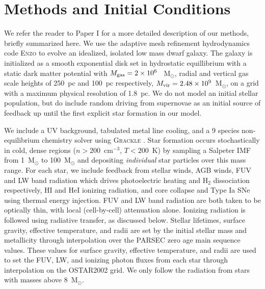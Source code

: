 \documentclass[twocolumn]{aastex62}
\begin{document}
{\section{Methods and Initial Conditions} \label{sec:methods}
We refer the reader to Paper I for a more detailed description of our methods, briefly summarized here. We use the adaptive mesh refinement hydrodynamics code \textsc{Enzo} \citep{Enzo2014} to evolve an idealized, isolated low mass dwarf galaxy. The galaxy is initialized as a smooth exponential disk set in hydrostatic equillibrium with a static dark matter potential \citep{Burkert1995} with $M_{\rm gas} = 2 \times 10^6~$~M$_{\odot}$, radial and vertical gas scale heights of 250~pc and 100~pc respectively, $M_{\rm vir} = 2.48 \times 10^9$~M$_{\odot}$, on a grid with a maximum physical resolution of 1.8~pc. We do not model an initial stellar population, but do include random driving from supernovae as an initial source of feedback up until the first explicit star formation in our model.

We include a UV background, tabulated metal line cooling, and a 9 species non-equilibrium chemistry solver using \textsc{Grackle} \citep{GrackleMethod}. Star formation occurs stochastically in cold, dense regions ($n > 200$~cm$^{-3}$, $T < 200$~K) by sampling a \cite{Salpeter1955} Salpeter IMF from 1~M$_{\odot}$ to 100~M$_{\odot}$ and depositing \textit{individual} star particles over this mass range. For each star, we include feedback from stellar winds, AGB winds, FUV and LW band radiation which drives photoelectric heating and H$_2$ dissociation respectively, HI and HeI ionizing radiation, and core collapse and Type Ia SNe using thermal energy injection. FUV and LW band radiation are both taken to be optically thin, with local (cell-by-cell) attenuation alone. Ionizing radiation is followed using radiative transfer, as discussed below. Stellar lifetimes, surface gravity, effective temperature, and radii are set by the initial stellar mass and metallicity through interpolation over the PARSEC \citep{Bressan2012} zero age main sequence values. These values for surface gravity, effective temperature, and radii are used to set the FUV, LW, and ionizing photon fluxes from each star through interpolation on the OSTAR2002 \citep{LanzHubeny2003} grid. We only follow the radiation from stars with masses above 8~M$_{\odot}$. 


}
\end{document}
